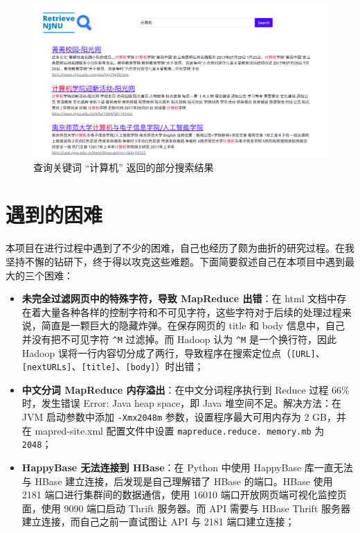 \documentclass{ctexart}
\newcommand{\code}[1]{\colorbox{backcolor}{\lstinline|#1|}}
\begin{document}
    \begin{figure}[t]
        \centering
        \includegraphics[width=\textwidth]{src/demo}
        \caption{查询关键词 “计算机” 返回的部分搜索结果}
        \label{fig:demo}
    \end{figure}


    \section{遇到的困难}\label{sec:difficulty}

    本项目在进行过程中遇到了不少的困难，自己也经历了颇为曲折的研究过程。在我坚持不懈的钻研下，终于得以攻克这些难题。下面简要叙述自己在本项目中遇到最大的三个困难：

    \begin{itemize}
        \item \textbf{未完全过滤网页中的特殊字符，导致 MapReduce 出错}：在 html 文档中存在着大量各种各样的控制字符和不可见字符，这些字符对于后续的处理过程来说，简直是一颗巨大的隐藏炸弹。在保存网页的 title 和 body 信息中，自己并没有把不可见字符 \code{^M} 过滤掉。而 Hadoop 认为 \code{^M} 是一个换行符，因此 Hadoop 误将一行内容切分成了两行，导致程序在搜索定位点（\code{[URL]}、\code{[nextURLs]}、\code{[title]}、\code{[body]}）时出错；
        \item \textbf{中文分词 MapReduce 内存溢出}：在中文分词程序执行到 Reduce 过程 66\% 时，发生错误 Error: Java heap space，即 Java 堆空间不足。解决方法：在 JVM 启动参数中添加 \code{-Xmx2048m} 参数，设置程序最大可用内存为 2 GB，并在 mapred-site.xml 配置文件中设置 \code{mapreduce.reduce. memory.mb} 为 \code{2048}；
        \item \textbf{HappyBase 无法连接到 HBase}：在 Python 中使用 HappyBase 库一直无法与 HBase 建立连接，后发现是自己理解错了 HBase 的端口。HBase 使用 2181 端口进行集群间的数据通信，使用 16010 端口开放网页端可视化监控页面，使用 9090 端口启动 Thrift 服务器。而 API 需要与 HBase Thrift 服务器建立连接，而自己之前一直试图让 API 与 2181 端口建立连接；
    \end{itemize}
\end{document}

